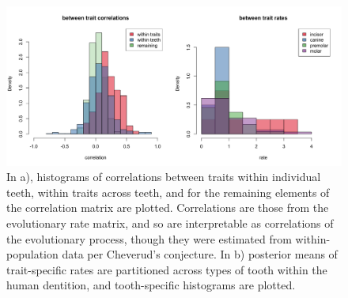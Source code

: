 \documentclass[12pt, twocolumn, twoside]{article}
\newcommand{\beginsupplement}{%
        \setcounter{table}{0}
        \renewcommand{\thetable}{S\arabic{table}}%
        \setcounter{figure}{0}
        \renewcommand{\thefigure}{S\arabic{figure}}%
}
\begin{document}
\begin{figure}[h]
\centering
\includegraphics[width=185mm]{figures/chpt4_figure5.png}
\caption{In a), histograms of correlations between traits within individual teeth, within traits across teeth, and for the remaining elements of the correlation matrix are plotted. Correlations are those from the evolutionary rate matrix, and so are interpretable as correlations of the evolutionary process, though they were estimated from within-population data per Cheverud's conjecture. In b) posterior means of trait-specific rates are partitioned across types of tooth within the human dentition, and tooth-specific histograms are plotted. \label{overflow}}
\end{figure}

\clearpage
\nocite{*}

\footnotesize

%


 

\null\thispagestyle{empty}\newpage
%
%
%
\end{document}

